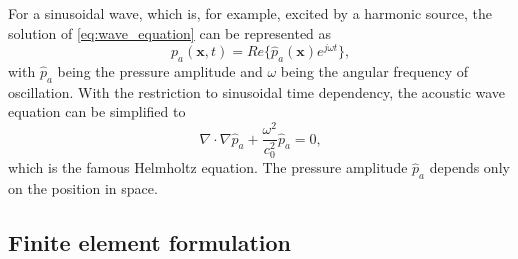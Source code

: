 For a sinusoidal wave, which is, for example, excited by a harmonic source, the solution of \cref{eq:wave_equation} can be represented as
\begin{equation}
	p_a(\boldsymbol{x},t) = Re\lbrace\hat{p}_a(\boldsymbol{x})e^{j\omega t}\rbrace \text{,} \label{eq:sinusoidal_wave}
\end{equation}
with $\hat{p}_a$ being the pressure amplitude and $\omega$ being the angular frequency of oscillation. With the restriction to sinusoidal time dependency, the acoustic wave equation can be simplified to
\begin{equation}
	\nabla\cdot\nabla\hat{p}_a + \frac{\omega^2}{c_0^2}\hat{p}_a = 0 \text{,} \label{eq:helmholtz_equation}
\end{equation}
which is the famous Helmholtz equation. The pressure amplitude $\hat{p}_a$ depends only on the position in space.

\subsection*{Finite element formulation}

